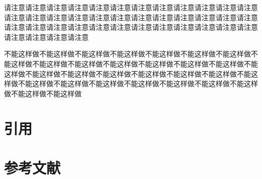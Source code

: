 \begin{attention}
    请注意请注意请注意请注意请注意请注意请注意请注意请注意请注意请注意请注意请注意请注意请注意请注意请注意请注意请注意请注意请注意请注意请注意请注意请注意请注意请注意请注意请注意请注意请注意请注意请注意请注意请注意请注意请注意请注意请注意请注意
\end{attention}

\begin{ban}
    不能这样做不能这样做不能这样做不能这样做不能这样做不能这样做不能这样做不能这样做不能这样做不能这样做不能这样做不能这样做不能这样做不能这样做不能这样做不能这样做不能这样做不能这样做不能这样做不能这样做不能这样做不能这样做不能这样做不能这样做不能这样做不能这样做不能这样做不能这样做不能这样做不能这样做不能这样做
\end{ban}


\section{引用}
    \lipsum[1]
\section{参考文献}
    \lipsum[1]


